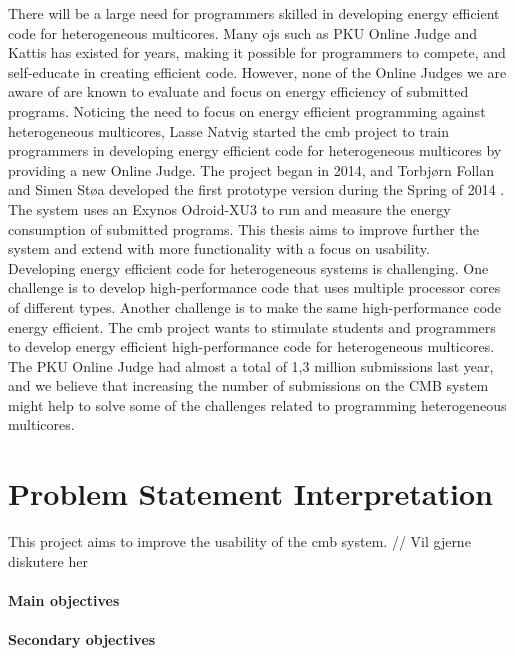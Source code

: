 There will be a large need for programmers skilled in developing energy efficient code for heterogeneous multicores. Many \gls{ojs} such as PKU Online Judge and Kattis has existed for years, making it possible for programmers to compete, and self-educate in creating efficient code. However, none of the Online Judges we are aware of are known to evaluate and focus on energy efficiency of submitted programs. Noticing the need to focus on energy efficient programming against heterogeneous multicores, Lasse Natvig started the \gls{cmb} project to train programmers in developing energy efficient code for heterogeneous multicores by providing a new Online Judge. The project began in 2014, and Torbjørn Follan and Simen Støa developed the first prototype version during the Spring of 2014 \cite{mt:T&S}. The system uses an Exynos Odroid-XU3 \cite{XU3} to run and measure the energy consumption of submitted programs. This thesis aims to improve further the system and extend with more functionality with a focus on usability. \\

Developing energy efficient code for heterogeneous systems is challenging. One challenge is to develop high-performance code that uses multiple processor cores of different types. Another challenge is to make the same high-performance code energy efficient. The \gls{cmb} project wants to stimulate students and programmers to develop energy efficient high-performance code for heterogeneous multicores. The PKU Online Judge \cite{PKU} had almost a total of 1,3 million submissions last year, and we believe that increasing the number of submissions on the CMB system might help to solve some of the challenges related to programming heterogeneous multicores. \\

\clearpage

\section{Problem Statement Interpretation}
\label{sec:rq}
This project aims to improve the usability of the \gls{cmb} system.
// Vil gjerne diskutere her


\paragraph*{Main objectives} \hfill


\paragraph*{Secondary objectives} \hfill



